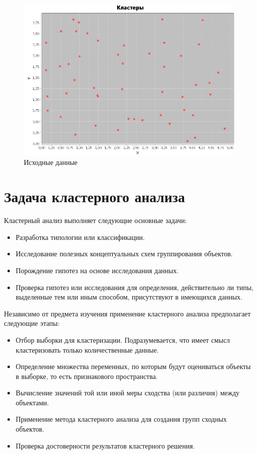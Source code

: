 \documentclass[a4paper,12pt]{article}
\begin{document}
\begin{center}
	\begin{figure}[h]
	\includegraphics[scale=0.8]{figure_0.png}
	\caption{Исходные данные}
	\label{fig:im_0}
	\end{figure}
\end{center}

\newpage\section{Задача кластерного анализа}
Кластерный анализ выполняет следующие основные задачи:
\begin{itemize}
\item
Разработка типологии или классификации.
\item
Исследование полезных концептуальных схем группирования объектов.
\item
Порождение гипотез на основе исследования данных.
\item
Проверка гипотез или исследования для определения, действительно ли типы, выделенные тем или иным способом, присутствуют в имеющихся данных.
\end{itemize}

\vspace{0.5cm}
Независимо от предмета изучения применение кластерного анализа предполагает следующие этапы:
\begin{itemize}
\item
Отбор выборки для кластеризации. Подразумевается, что имеет смысл кластеризовать только количественные данные.
\item
Определение множества переменных, по которым будут оцениваться объекты в выборке, то есть признакового пространства.
\item
Вычисление значений той или иной меры сходства (или различия) между объектами.
\item
Применение метода кластерного анализа для создания групп сходных объектов.
\item
Проверка достоверности результатов кластерного решения.
\end{itemize}
\end{document}
